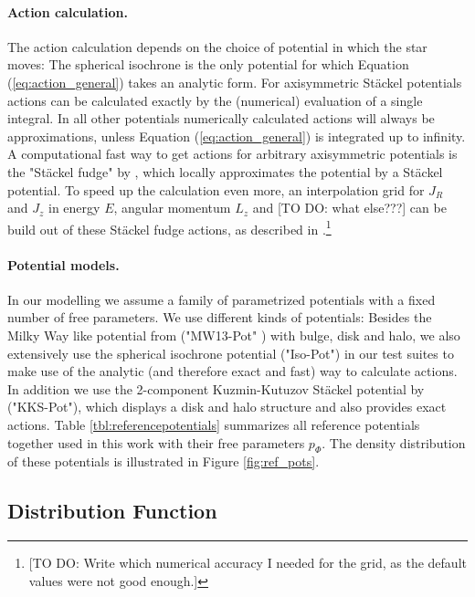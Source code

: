 \paragraph{Action calculation.} The action calculation depends on the choice of potential in which the star moves: The spherical isochrone \citep{bin08} is the only potential for which Equation (\ref{eq:action_general}) takes an analytic form. For axisymmetric St\"{a}ckel potentials actions can be calculated exactly by the (numerical) evaluation of a single integral. In all other potentials numerically calculated actions will always be approximations, unless Equation (\ref{eq:action_general}) is integrated up to infinity.  A computational fast way to get actions for arbitrary axisymmetric potentials is the "St\"{a}ckel fudge" by \citet{bin12}, which locally approximates the potential by a St\"{a}ckel potential. To speed up the calculation even more, an interpolation grid for $J_R$ and $J_z$ in energy $E$, angular momentum $L_z$ and [TO DO: what else???] can be build out of these St\"{a}ckel fudge actions, as described in \citet{bov15}.\footnote{[TO DO: Write which numerical accuracy I needed for the grid, as the default values were not good enough.]} 

\paragraph{Potential models.} In our modelling we assume a family of parametrized potentials with a fixed number of free parameters. We use different kinds of potentials: Besides the Milky Way like potential from \citet{bov13} ("MW13-Pot" ) with bulge, disk and halo, we also extensively use the spherical isochrone potential ("Iso-Pot") in our test suites to make use of the analytic (and therefore exact and fast) way  to calculate actions. In addition we use the 2-component Kuzmin-Kutuzov St\"{a}ckel potential by \citet{bat94} ("KKS-Pot"), which displays a disk and halo structure and also provides exact actions. Table \ref{tbl:referencepotentials} summarizes all reference potentials together used in this work with their free parameters $p_\Phi$. The density distribution of these potentials is illustrated in Figure \ref{fig:ref_pots}.




\subsection{Distribution Function} \label{sec:qDF}

